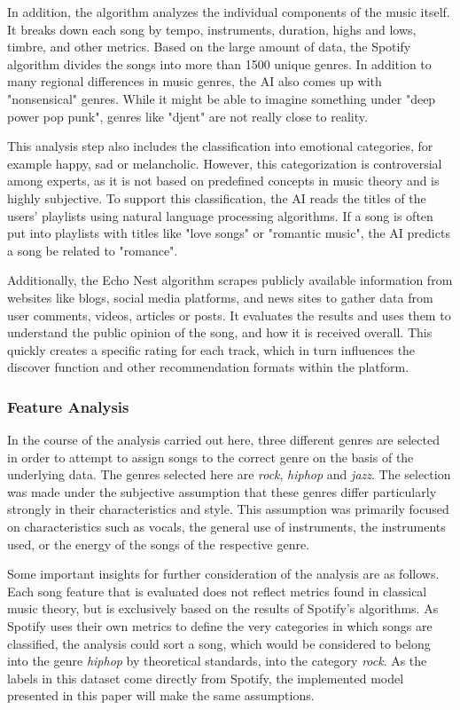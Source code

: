 In addition, the algorithm analyzes the individual components of the music itself. 
It breaks down each song by tempo, instruments, duration, highs and lows, timbre, and other metrics. 
Based on the large amount of data, the Spotify algorithm divides the songs into more than 1500 unique genres. 
In addition to many regional differences in music genres, the AI also comes up with "nonsensical" genres.
While it might be able to imagine something under "deep power pop punk",
genres like "djent" are not really close to reality. \cite[]{Boyd2019}

This analysis step also includes the classification into emotional categories, for example happy, sad or
melancholic. However, this categorization is controversial among experts, as it is not based on predefined concepts in music
theory and is highly subjective.
To support this classification, the AI reads the titles of the users' playlists using natural language processing algorithms.
If a song is often put into playlists with titles like "love songs" or "romantic music",
the AI predicts a song be related to "romance". \cite[]{Boyd2019}

Additionally, the Echo Nest algorithm scrapes publicly available information from websites like blogs, social media platforms,
and news sites to gather data from user comments, videos, articles or posts.
It evaluates the results and uses them to understand the public opinion of the song,
and how it is received overall.
This quickly creates a specific rating for each track, which in turn influences the
discover function and other recommendation formats within the platform. \cite[]{Boyd2019}

\subsubsection{Feature Analysis}

In the course of the analysis carried out here, three different genres are selected in order
to attempt to assign songs to the correct genre on the basis of the underlying data. 
The genres selected here are \emph{rock}, \emph{hiphop} and \emph{jazz}. The selection was made under the
subjective assumption that these genres differ particularly strongly in their characteristics and style. 
This assumption was primarily focused on characteristics such as vocals, the general use of instruments,
the instruments used, or the energy of the songs of the respective genre.

Some important insights for further consideration of the analysis are as follows.
Each song feature that is evaluated does not reflect metrics found in classical music theory, 
but is exclusively based on the results of Spotify's algorithms.
As Spotify uses their own metrics to define the very categories in which songs are classified,
the analysis could sort a song, which would be considered to belong into the genre \emph{hiphop} by theoretical
standards, into the category \emph{rock}. As the labels in this dataset come directly from Spotify,
the implemented model presented in this paper will make the same assumptions.

